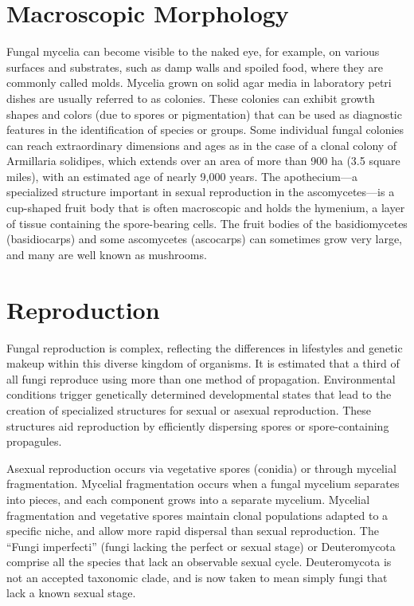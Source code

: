 \documentclass[]{book}
\theoremstyle{definition}
\theoremstyle{definition}
\theoremstyle{definition}
\theoremstyle{remark}
\begin{document}
\section{Macroscopic Morphology}\label{macroscopic-morphology}

Fungal mycelia can become visible to the naked eye, for example, on
various surfaces and substrates, such as damp walls and spoiled food,
where they are commonly called molds. Mycelia grown on solid agar media
in laboratory petri dishes are usually referred to as colonies. These
colonies can exhibit growth shapes and colors (due to spores or
pigmentation) that can be used as diagnostic features in the
identification of species or groups. Some individual fungal colonies can
reach extraordinary dimensions and ages as in the case of a clonal
colony of Armillaria solidipes, which extends over an area of more than
900 ha (3.5 square miles), with an estimated age of nearly 9,000 years.
The apothecium---a specialized structure important in sexual
reproduction in the ascomycetes---is a cup-shaped fruit body that is
often macroscopic and holds the hymenium, a layer of tissue containing
the spore-bearing cells. The fruit bodies of the basidiomycetes
(basidiocarps) and some ascomycetes (ascocarps) can sometimes grow very
large, and many are well known as mushrooms.

\section{Reproduction}\label{reproduction}

Fungal reproduction is complex, reflecting the differences in lifestyles
and genetic makeup within this diverse kingdom of organisms. It is
estimated that a third of all fungi reproduce using more than one method
of propagation. Environmental conditions trigger genetically determined
developmental states that lead to the creation of specialized structures
for sexual or asexual reproduction. These structures aid reproduction by
efficiently dispersing spores or spore-containing propagules.

Asexual reproduction occurs via vegetative spores (conidia) or through
mycelial fragmentation. Mycelial fragmentation occurs when a fungal
mycelium separates into pieces, and each component grows into a separate
mycelium. Mycelial fragmentation and vegetative spores maintain clonal
populations adapted to a specific niche, and allow more rapid dispersal
than sexual reproduction. The ``Fungi imperfecti'' (fungi lacking the
perfect or sexual stage) or Deuteromycota comprise all the species that
lack an observable sexual cycle. Deuteromycota is not an accepted
taxonomic clade, and is now taken to mean simply fungi that lack a known
sexual stage.
\end{document}
